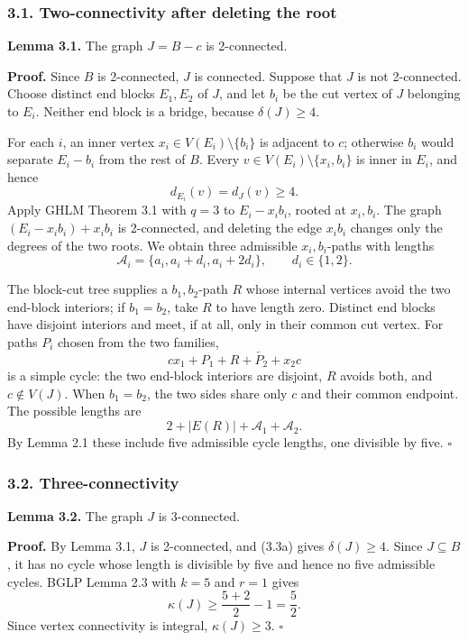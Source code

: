 \documentclass[
  11pt]{article}
\let\papersubsection\subsubsection
\renewcommand{\subsubsection}{\Needspace{7\baselineskip}\papersubsection}
\begin{document}
\subsubsection{3.1. Two-connectivity after deleting the
root}\label{two-connectivity-after-deleting-the-root}

\textbf{Lemma 3.1.} The graph \(J=B-c\) is 2-connected.

\textbf{Proof.} Since \(B\) is 2-connected, \(J\) is connected. Suppose
that \(J\) is not 2-connected. Choose distinct end blocks \(E_1,E_2\) of
\(J\), and let \(b_i\) be the cut vertex of \(J\) belonging to \(E_i\).
Neither end block is a bridge, because \(\delta(J)\ge4\).

For each \(i\), an inner vertex \(x_i\in V(E_i)\setminus\{b_i\}\) is
adjacent to \(c\); otherwise \(b_i\) would separate \(E_i-b_i\) from the
rest of \(B\). Every \(v\in V(E_i)\setminus\{x_i,b_i\}\) is inner in
\(E_i\), and hence \[
 d_{E_i}(v)=d_J(v)\ge4.
\] Apply GHLM Theorem 3.1 with \(q=3\) to \(E_i-x_ib_i\), rooted at
\(x_i,b_i\). The graph \((E_i-x_ib_i)+x_ib_i\) is 2-connected, and
deleting the edge \(x_ib_i\) changes only the degrees of the two roots.
We obtain three admissible \(x_i,b_i\)-paths with lengths \[
 \mathcal A_i=\{a_i,a_i+d_i,a_i+2d_i\},
 \qquad d_i\in\{1,2\}.
\]

The block-cut tree supplies a \(b_1,b_2\)-path \(R\) whose internal
vertices avoid the two end-block interiors; if \(b_1=b_2\), take \(R\)
to have length zero. Distinct end blocks have disjoint interiors and
meet, if at all, only in their common cut vertex. For paths \(P_i\)
chosen from the two families, \[
 c x_1+P_1+R+\overleftarrow{P_2}+x_2c
\] is a simple cycle: the two end-block interiors are disjoint, \(R\)
avoids both, and \(c\notin V(J)\). When \(b_1=b_2\), the two sides share
only \(c\) and their common endpoint. The possible lengths are \[
 2+|E(R)|+\mathcal A_1+\mathcal A_2.
\] By Lemma 2.1 these include five admissible cycle lengths, one
divisible by five. \(\square\)

\subsubsection{3.2. Three-connectivity}\label{three-connectivity}

\textbf{Lemma 3.2.} The graph \(J\) is 3-connected.

\textbf{Proof.} By Lemma 3.1, \(J\) is 2-connected, and (3.3a) gives
\(\delta(J)\ge4\). Since \(J\subseteq B\), it has no cycle whose length
is divisible by five and hence no five admissible cycles. BGLP Lemma 2.3
with \(k=5\) and \(r=1\) gives \[
 \kappa(J)\ge \frac{5+2}{2}-1=\frac52.
\] Since vertex connectivity is integral, \(\kappa(J)\ge3\). \(\square\)
\end{document}
